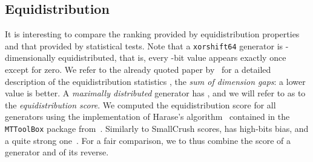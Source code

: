 \documentclass{acmsmalltr}
\newcommand{\xorshift}[1][]{\texttt{xorshift#1}\xspace}
\begin{document}
\begin{table}
\end{table}


\begin{table}
\end{table} 

\subsection{Equidistribution}

It is interesting to compare the ranking provided
by equidistribution properties and that provided by statistical tests. 
Note that a \xorshift[64] generator is
-dimensionally equidistributed, that is, every -bit value appears exactly
once except for zero.
We refer to
the already quoted paper by~ for a detailed
description of the equidistribution statistics , the \emph{sum of
dimension gaps}: a lower value is better. A \emph{maximally distributed}
generator has , and we will refer to  as to the
\emph{equidistribution score}.
We computed the equidistribution score for all generators using the implementation of Harase's algorithm~\cite{HarELRM}
contained in the \texttt{MTToolBox} package from~.
Similarly to SmallCrush scores,  has 
high-bits bias, and a quite strong one~\cite{LEPFRNG}. 
For a fair comparison, we to thus combine the  score of a generator
and of its reverse.  
\end{document}
